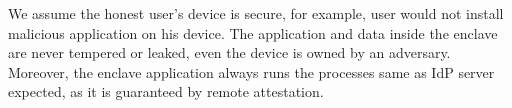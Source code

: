 We assume the honest user's device is secure, for example, user would not install malicious application on his device.
The application and data inside the enclave are never tempered or leaked, even %
the device is owned by an adversary.
Moreover, the enclave application always runs the processes same as IdP server expected, as it is guaranteed by remote attestation.



